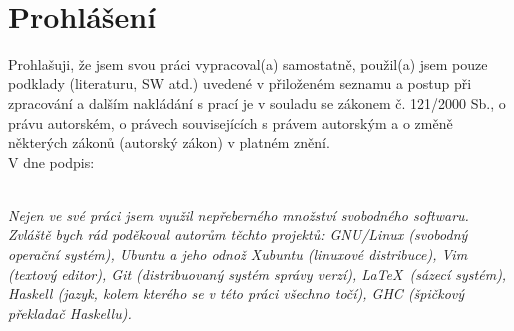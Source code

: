 \setcounter{page}{1}
\thispagestyle{empty}

\newpage


~\\[15cm]
\section*{Prohlášení}

Prohlašuji, že jsem svou práci vypracoval(a) samostatně, použil(a) jsem pouze
podklady (literaturu, SW atd.) uvedené v přiloženém seznamu a postup při
zpracování a dalším nakládání s prací je v souladu se zákonem č. 121/2000 Sb.,
o právu autorském, o právech souvisejících s právem autorským a o změně
některých zákonů (autorský zákon) v platném znění.\\[0.5cm]

V \makebox[3cm]{\dotfill} dne \makebox[4cm]{\dotfill}
podpis: \makebox[6cm]{\dotfill}

\newpage


~\\[15cm]
\textit{
Nejen ve své práci jsem využil nepřeberného množství svobodného softwaru.
Zvláště bych rád poděkoval autorům těchto projektů:
GNU/Linux (svobodný operační systém),
Ubuntu a jeho odnož Xubuntu (linuxové distribuce),
Vim (textový editor),
Git (distribuovaný systém správy verzí),
\LaTeX\ (sázecí systém),
Haskell (jazyk, kolem kterého se v této práci všechno točí),
GHC (špičkový překladač Haskellu).
}

\newpage
